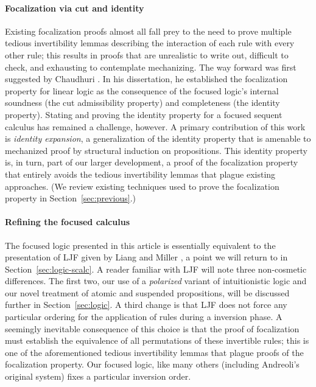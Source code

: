 \documentclass[acmtocl]{robtrans}\pdfoutput=1
\begin{document}
\paragraph*{Focalization via cut and identity}
Existing focalization proofs almost all fall prey to the need to prove
multiple tedious invertibility lemmas describing the interaction of
each rule with every other rule; this results in proofs that are
unrealistic to write out, difficult to check, and exhausting to
contemplate mechanizing. The way forward was first suggested by
Chaudhuri . In his dissertation, he
established the focalization property for linear logic as the
consequence of the focused logic's internal soundness (the cut
admissibility property) and completeness (the identity property).
Stating and proving the identity property for a focused sequent
calculus has remained a challenge, however. A primary contribution of
this work is {\it identity expansion}, a generalization of the
identity property that is amenable to mechanized proof by structural
induction on propositions. This identity property is, in turn, part of
our larger development, a proof of the focalization property that
entirely avoids the tedious invertibility lemmas that plague existing
approaches.  (We review existing techniques used to prove the
focalization property in Section~\ref{sec:previous}.)

\paragraph*{Refining the focused calculus}
The focused logic presented in this article is essentially equivalent
to the presentation of LJF given by Liang and Miller
, a point we will return to in
Section~\ref{sec:logic-scalc}. A reader familiar with LJF will note
three non-cosmetic differences.  The first two, our use of a {\it
  polarized} variant of intuitionistic logic and our novel treatment
of atomic and suspended propositions, will be discussed further in
Section~\ref{sec:logic}.  A third change is that LJF does not force
any particular ordering for the application of rules during a
inversion phase. A seemingly inevitable consequence of this choice is
that the proof of focalization must establish the equivalence of all
permutations of these invertible rules; this is one of the
aforementioned tedious invertibility lemmas that plague proofs of the
focalization property. Our focused logic, like many others (including
Andreoli's original system) fixes a particular inversion order.
\end{document}
